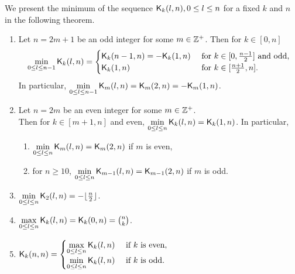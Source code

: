 \documentclass{llncs}
\begin{document}
We present the minimum of the sequence $\mathsf{K}_{k}(l,n), 0 \leq l \leq n$ for a fixed $k$ and $n$ in the following theorem.
\begin{theorem}\label{thm:minK}
\begin{enumerate}
\item\label{itm:odd} Let $n = 2m+1$ be an odd integer for some $m \in \mathbb{Z}^+$. Then for $k \in [0,n]$ 
$$\min\limits_{0 \leq l \leq n-1 }\mathsf{K}_{k}(l,n) = 
\begin{cases}
\mathsf{K}_{k}(n-1,n) = -\mathsf{K}_{k}(1,n) & \text{ for  } k \in [0,\frac{n-1}{2}] \text{ and odd}, \\
\mathsf{K}_{k}(1,n) & \text{ for }    k \in [\frac{n+1}{2}, n].
\end{cases}$$
In particular, $\min\limits_{0 \leq l \leq n-1 }\mathsf{K}_{m}(l,n) = \mathsf{K}_{m}(2,n) = -\mathsf{K}_{m}(1,n)$.

\item\label{itm:even} Let $n = 2m$ be an even integer for some $m \in \mathbb{Z}^+$.\\ Then for $k \in [m+1, n]$ and even,
$\min\limits_{0 \leq l \leq n }\mathsf{K}_{k}(l,n)= \mathsf{K}_{k}(1,n)$.
In particular,
\begin{enumerate}
\item $\min\limits_{0 \leq l \leq n }\mathsf{K}_{m}(l,n)= \mathsf{K}_{m}(2,n)$ if $m$ is even,
\item  for $n \geq 10$, $\min\limits_{0 \leq l \leq n }\mathsf{K}_{m - 1}(l,n) = \mathsf{K}_{m - 1}(2,n)$ if $m$ is odd.
\end{enumerate}
\item\label{itm:min2} $\min\limits_{0 \leq l \leq n} \mathsf{K}_{2}(l,n) = -\lfloor \frac{n}{2} \rfloor$.
\item\label{itm:maxk} $\max\limits_{0 \leq l \leq n} \mathsf{K}_{k}(l,n) = \mathsf{K}_{k}(0,n) = {n \choose k}$.
\item\label{itm:minmaxn} $\mathsf{K}_{k}(n,n) 
=  \begin{cases}
\max\limits_{0 \leq l \leq n} \mathsf{K}_{k}(l,n) & \text{ if $k$ is even},\\
\min\limits_{0 \leq l \leq n} \mathsf{K}_{k}(l,n) & \text{ if $k$ is odd}.
\end{cases}$
\end{enumerate}
\end{theorem}
\end{document}
